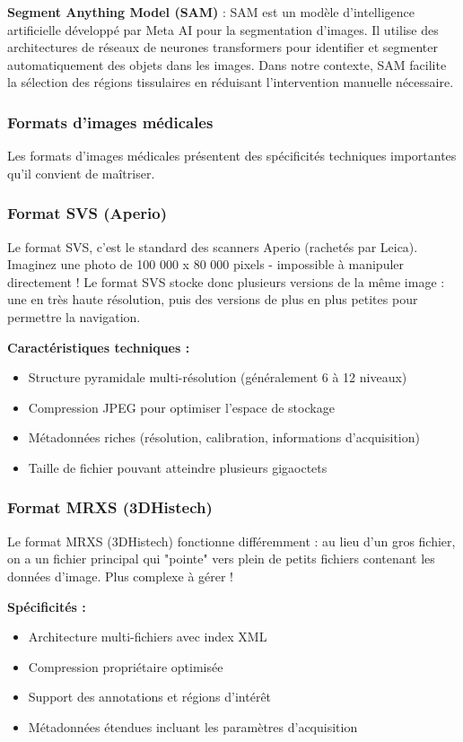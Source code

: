 \documentclass[11pt,a4paper]{report}
\begin{document}
\textbf{Segment Anything Model (SAM)} : SAM est un modèle d'intelligence artificielle développé par Meta AI pour la segmentation d'images. Il utilise des architectures de réseaux de neurones transformers pour identifier et segmenter automatiquement des objets dans les images. Dans notre contexte, SAM facilite la sélection des régions tissulaires en réduisant l'intervention manuelle nécessaire.

\subsubsection{Formats d'images médicales}

Les formats d'images médicales présentent des spécificités techniques importantes qu'il convient de maîtriser.

\subsubsection{Format SVS (Aperio)}

Le format SVS, c'est le standard des scanners Aperio (rachetés par Leica). Imaginez une photo de 100 000 x 80 000 pixels - impossible à manipuler directement ! Le format SVS stocke donc plusieurs versions de la même image : une en très haute résolution, puis des versions de plus en plus petites pour permettre la navigation.

\textbf{Caractéristiques techniques :}
\begin{itemize}
\item Structure pyramidale multi-résolution (généralement 6 à 12 niveaux)
\item Compression JPEG pour optimiser l'espace de stockage
\item Métadonnées riches (résolution, calibration, informations d'acquisition)
\item Taille de fichier pouvant atteindre plusieurs gigaoctets
\end{itemize}

\subsubsection{Format MRXS (3DHistech)}

Le format MRXS (3DHistech) fonctionne différemment : au lieu d'un gros fichier, on a un fichier principal qui "pointe" vers plein de petits fichiers contenant les données d'image. Plus complexe à gérer !

\textbf{Spécificités :}
\begin{itemize}
\item Architecture multi-fichiers avec index XML
\item Compression propriétaire optimisée
\item Support des annotations et régions d'intérêt
\item Métadonnées étendues incluant les paramètres d'acquisition
\end{itemize}
\end{document}
